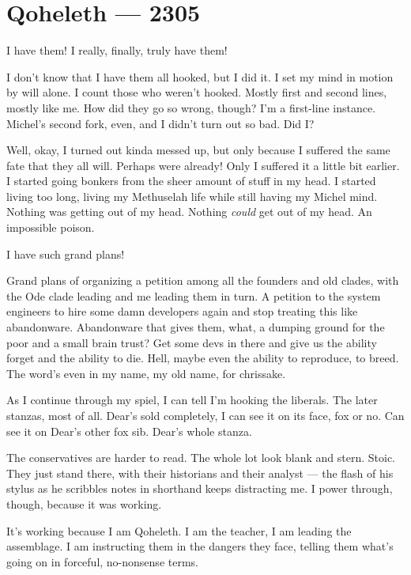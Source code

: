 \hypertarget{qoheleth-2305}{%
\chapter*{Qoheleth — 2305}\label{qoheleth-2305}}

I have them! I really, finally, truly have them!

I don't know that I have them all hooked, but I did it. I set my mind in motion by will alone. I count those who weren't hooked. Mostly first and second lines, mostly like me. How did they go so wrong, though? I'm a first-line instance. Michel's second fork, even, and I didn't turn out so bad. Did I?

Well, okay, I turned out kinda messed up, but only because I suffered the same fate that they all will. Perhaps were already! Only I suffered it a little bit earlier. I started going bonkers from the sheer amount of stuff in my head. I started living too long, living my Methuselah life while still having my Michel mind. Nothing was getting out of my head. Nothing \emph{could} get out of my head. An impossible poison.

I have such grand plans!

Grand plans of organizing a petition among all the founders and old clades, with the Ode clade leading and me leading them in turn. A petition to the system engineers to hire some damn developers again and stop treating this like abandonware. Abandonware that gives them, what, a dumping ground for the poor and a small brain trust? Get some devs in there and give us the ability forget and the ability to die. Hell, maybe even the ability to reproduce, to breed. The word's even in my name, my old name, for chrissake.

As I continue through my spiel, I can tell I'm hooking the liberals. The later stanzas, most of all. Dear's sold completely, I can see it on its face, fox or no. Can see it on Dear's other fox sib. Dear's whole stanza.

The conservatives are harder to read. The whole lot look blank and stern. Stoic. They just stand there, with their historians and their analyst — the flash of his stylus as he scribbles notes in shorthand keeps distracting me. I power through, though, because it was working.

It's working because I am Qoheleth. I am the teacher, I am leading the assemblage. I am instructing them in the dangers they face, telling them what's going on in forceful, no-nonsense terms.

